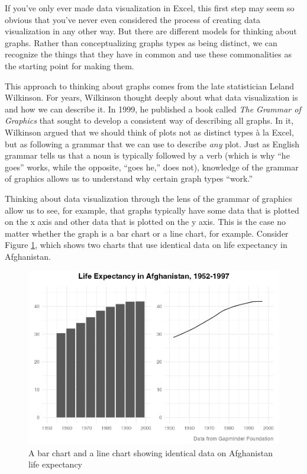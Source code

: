 \documentclass[
]{book}
\begin{document}
If you've only ever made data visualization in Excel, this first step may seem so obvious that you've never even considered the process of creating data visualization in any other way. But there are different models for thinking about graphs. Rather than conceptualizing graphs types as being distinct, we can recognize the things that they have in common and use these commonalities as the starting point for making them.

This approach to thinking about graphs comes from the late statistician Leland Wilkinson. For years, Wilkinson thought deeply about what data visualization is and how we can describe it. In 1999, he published a book called \emph{The Grammar of Graphics} that sought to develop a consistent way of describing all graphs. In it, Wilkinson argued that we should think of plots not as distinct types à la Excel, but as following a grammar that we can use to describe \emph{any} plot. Just as English grammar tells us that a noun is typically followed by a verb (which is why ``he goes'' works, while the opposite, ``goes he,'' does not), knowledge of the grammar of graphics allows us to understand why certain graph types ``work.''

Thinking about data visualization through the lens of the grammar of graphics allow us to see, for example, that graphs typically have some data that is plotted on the x axis and other data that is plotted on the y axis. This is the case no matter whether the graph is a bar chart or a line chart, for example. Consider Figure \ref{fig:bar-line-chart}, which shows two charts that use identical data on life expectancy in Afghanistan.

\begin{figure}
\includegraphics[width=1\linewidth]{data-viz_files/figure-latex/bar-line-chart-1} \caption{A bar chart and a line chart showing identical data on Afghanistan life expectancy}\label{fig:bar-line-chart}
\end{figure}
\end{document}
